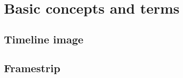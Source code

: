 \chapter{Basic concepts and terms}\label{chapt:Concepts}
\section{Timeline image}

\section{Framestrip}

